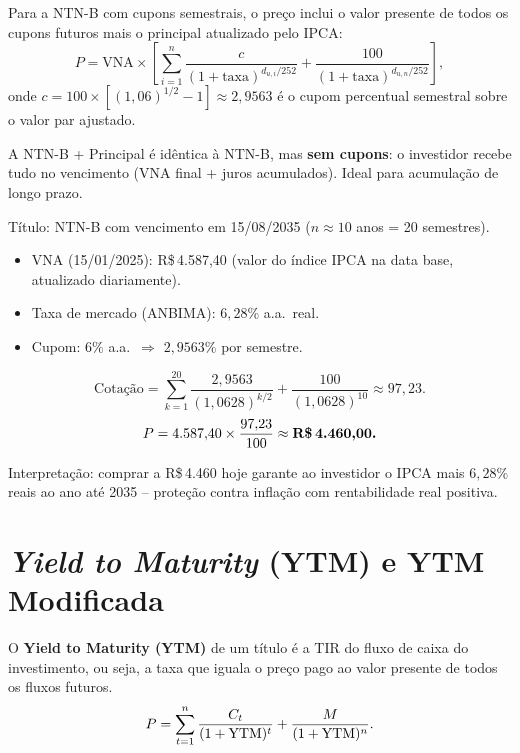 Para a NTN-B com cupons semestrais, o preço inclui o valor presente de todos os cupons
futuros mais o principal atualizado pelo IPCA:
\[
  P = \text{VNA} \times \left[\sum_{i=1}^{n}
      \frac{c}{(1+\text{taxa})^{d_{u,i}/252}}
      + \frac{100}{(1+\text{taxa})^{d_{u,n}/252}}\right],
\]
onde $c = 100 \times[(1{,}06)^{1/2}-1] \approx 2{,}9563$ é o cupom percentual semestral
sobre o valor par ajustado.

\begin{nota}
A NTN-B + Principal é idêntica à NTN-B, mas \textbf{sem cupons}: o investidor recebe tudo
no vencimento (VNA final + juros acumulados). Ideal para acumulação de longo prazo.
\end{nota}

\begin{moderno}[title={NTN-B -- precificação em 2025}]
Título: NTN-B com vencimento em 15/08/2035 ($n \approx 10$ anos = 20 semestres).

\begin{itemize}[leftmargin=1.8em, nosep]
  \item VNA (15/01/2025): R\$\,4.587,40 (valor do índice IPCA na data base, atualizado diariamente).
  \item Taxa de mercado (ANBIMA): $6{,}28\%$ a.a.\ real.
  \item Cupom: $6\%$ a.a.\ $\Rightarrow$ $2{,}9563\%$ por semestre.
\end{itemize}

\[
  \text{Cotação} = \sum_{k=1}^{20} \frac{2{,}9563}{(1{,}0628)^{k/2}}
                 + \frac{100}{(1{,}0628)^{10}}
                 \approx 97{,}23.
\]
\[
  P = 4{.}587{,}40 \times \frac{97{,}23}{100} \approx \textbf{R\$\,4.460{,}00.}
\]

Interpretação: comprar a R\$\,4.460 hoje garante ao investidor o IPCA mais $6{,}28\%$ reais ao ano
até 2035 -- proteção contra inflação com rentabilidade real positiva.
\end{moderno}

\section{\textit{Yield to Maturity} (YTM) e YTM Modificada}

\begin{definicao}
O \textbf{Yield to Maturity (YTM)} de um título é a TIR do fluxo de caixa do investimento,
ou seja, a taxa que iguala o preço pago ao valor presente de todos os fluxos futuros.
\[
  P = \sum_{t=1}^{n}\frac{C_t}{(1+\mathrm{YTM})^t} + \frac{M}{(1+\mathrm{YTM})^n}.
\]
\end{definicao}

